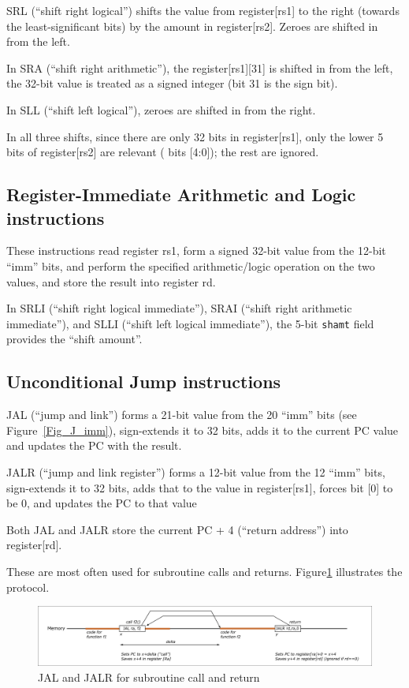 SRL (``shift right logical'') shifts the value from register[rs1] to
the right (towards the least-significant bits) by the amount in
register[rs2].  Zeroes are shifted in from the left.

In SRA (``shift right arithmetic''), the register[rs1][31] is shifted
in from the left, {\ie} the 32-bit value is treated as a signed
integer (bit 31 is the sign bit).

In SLL (``shift left logical''), zeroes are shifted in from the right.

In all three shifts, since there are only 32 bits in register[rs1],
only the lower 5 bits of register[rs2] are relevant ({\ie} bits
[4:0]); the rest are ignored.


\subsection{Register-Immediate Arithmetic and Logic instructions}

These instructions read register rs1, form a signed 32-bit value from
the 12-bit ``imm'' bits, and perform the specified arithmetic/logic
operation on the two values, and store the result into register rd.

In SRLI (``shift right logical immediate''), SRAI (``shift right
arithmetic immediate''), and SLLI (``shift left logical immediate''),
the 5-bit \verb|shamt| field provides the ``shift amount''.


\subsection{Unconditional Jump instructions}

JAL (``jump and link'') forms a 21-bit value from the 20 ``imm'' bits
(see Figure~\ref{Fig_J_imm}), sign-extends it to 32 bits, adds it to
the current PC value and updates the PC with the result.

JALR (``jump and link register'') forms a 12-bit value from the 12
``imm'' bits, sign-extends it to 32 bits, adds that to the value in
register[rs1], forces bit [0] to be 0, and updates the PC to that
value

Both JAL and JALR store the current PC + 4 (``return address'') into
register[rd].

These are most often used for subroutine calls and returns.
Figure\ref{Fig_JAL_JALR} illustrates the protocol.
\begin{figure}[htbp]
  \centerline{\includegraphics[width=6in,angle=0]{Figures/Fig_JAL_JALR}}
  \caption{\label{Fig_JAL_JALR} JAL and JALR for subroutine call and return}
\end{figure}

